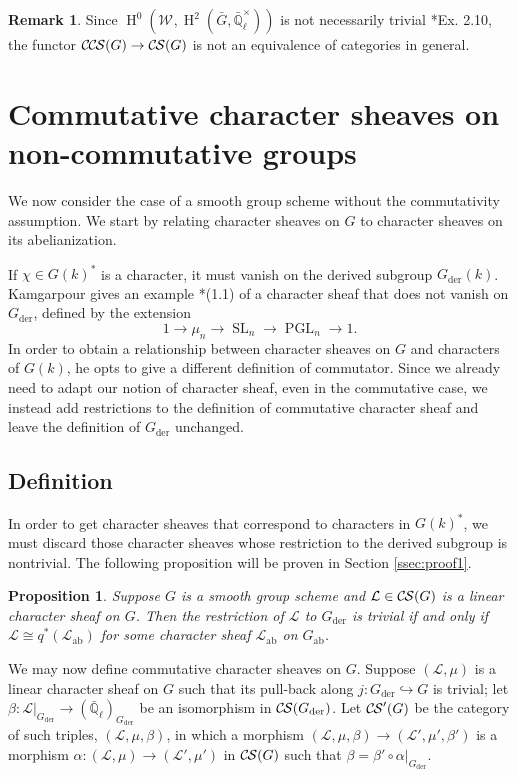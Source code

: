 \documentclass[10pt]{amsart}
\theoremstyle{plain}
\newtheorem{proposition}[theorem]{Proposition}
\theoremstyle{definition}
\newtheorem{remark}[theorem]{Remark}
\newcommand{\EE}{\mathbb{\bar Q}_\ell}
\newcommand{\EEx}{\EE^\times}
\newcommand{\Weil}[1]{\mathcal{W}_{#1}}
\DeclareMathOperator{\Hh}{H}
\DeclareMathOperator{\SL}{SL}
\DeclareMathOperator{\PGL}{PGL}
\newcommand{\der}{_{\operatorname{der}}}
\newcommand{\ab}{_{\operatorname{ab}}}
\newcommand{\cs}[1]{{\mathcal{#1}}}
\newcommand{\CS}{{\mathcal{C\hskip-0.8pt S}}}
\newcommand{\CCS}{{\mathcal{C\hskip-.8pt C\hskip-0.8pt S}}}
\newcommand{\bG}{\bar{G}}
\begin{document}
\begin{remark}
Since $\Hh^0(\Weil{},\Hh^2(\bG,\EEx))$ is not necessarily trivial \cite{cunningham-roe:13a}*{Ex. 2.10}, the functor
$\CCS(G) \to \CS(G)$ is not an equivalence of categories in general.
\end{remark}

\section{Commutative character sheaves on non-commutative groups}\label{sec:noncom}

We now consider the case of a smooth group scheme without the commutativity assumption.  We start
by relating character sheaves on $G$ to character sheaves on its abelianization.

If $\chi \in G(k)^*$ is a character, it must vanish on the derived subgroup $G\der(k)$.
Kamgarpour gives an example \cite{kamgarpour:09a}*{(1.1)} of a character sheaf
that does not vanish on $G\der$, defined by the extension
\[
1 \to \mu_n \to \SL_n \to \PGL_n \to 1.
\]
In order to obtain a relationship between character sheaves on $G$ and characters of $G(k)$,
he opts to give a different definition of commutator.  Since we already need to adapt our
notion of character sheaf, even in the commutative case, we instead add restrictions
to the definition of commutative character sheaf and leave the definition of $G\der$ unchanged.

\subsection{Definition}\label{ssec:noncomdef}

In order to get character sheaves that correspond to characters in $G(k)^*$, we must discard those
character sheaves whose restriction to the derived subgroup is nontrivial.
The following proposition will be proven in Section \ref{ssec:proof1}.
\begin{proposition} \label{prop:Gder_triv}
Suppose $G$ is a smooth group scheme and $\cs{L} \in \CS(G)$ is a linear character sheaf on $G$.
Then the restriction of $\cs{L}$ to $G\der$ is trivial if and only if $\cs{L} \cong q^*(\cs{L}\ab)$ for some
character sheaf $\cs{L}\ab$ on $G\ab$.
\end{proposition}

We may now define commutative character sheaves on $G$.
%
Suppose $(\cs{L},\mu)$ is a linear character sheaf on $G$ such that its pull-back along
$j: G\der \hookrightarrow G$ is trivial;
let $\beta : \cs{L}\vert_{G\der} \to (\EE)_{G\der}$ be an isomorphism in $\CS(G\der)$.
Let $\CS'(G)$ be the category of such triples, $(\cs{L},\mu,\beta)$, in which a morphism $(\cs{L},\mu,\beta)\to (\cs{L}',\mu',\beta')$ is a morphism $\alpha : (\cs{L},\mu)\to (\cs{L}',\mu')$ in $\CS(G)$ such that $\beta = \beta' \circ \alpha\vert_{G\der}$.
%
\end{document}
